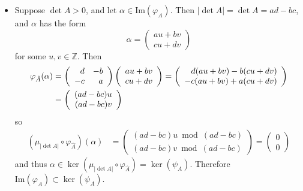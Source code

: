 \documentclass{article}
\begin{document}
\begin{Answer}
\begin{enumerate}[(a)]
{\begin{itemize}
{        so $\mu_n$ is a homomorphism. Let $A \in
        \mathrm{GL}_2(\mathbb{Z})$. Then $\det A \neq 0$ and therefore
        $|\det A|$ is a positive integer, so
        $\psi_A = \mu_{|\det A|} \circ \varphi_{\hat{A}}$ is a
        composition of homomorphisms and thus a homomorphism itself.
      }
      \item{
        Suppose $\det A > 0$, and let $\alpha \in
        \mathrm{Im}(\varphi_A)$.
        Then $|\det A| = \det A = ad - bc$, and
        $\alpha$ has the form
        $$
        \alpha =
        \left(\begin{array}{c}
          a u + b v \\
          c u + d v
        \end{array}\right)
        $$
        for some $u, v \in \mathbb{Z}$. Then
        \begin{align*}
        \varphi_{\hat{A}}(\alpha) &=
        \left(\begin{array}{r r}
           d & -b \\
          -c &  a
        \end{array}\right)
        \left(\begin{array}{c}
          a u + b v \\
          c u + d v
        \end{array}\right) =
        \left(\begin{array}{r}
          d(a u + b v) - b(c u + d v) \\
         -c(a u + b v) + a(c u + d v)
        \end{array}\right) \\ &=
        \left(\begin{array}{r}
          (a d - b c) u \\
          (a d - b c) v
        \end{array}\right)
        \end{align*}
        so
        \begin{align*}
        (\mu_{|\det A|} \circ \varphi_{\hat{A}})(\alpha) &=
        \left(\begin{array}{r}
          (a d - b c) u \bmod (ad - bc) \\
          (a d - b c) v \bmod (ad - bc)
        \end{array}\right) =
        \left(\begin{array}{r}
          0 \\
          0
        \end{array}\right)
        \end{align*}
        and thus $\alpha \in \ker(\mu_{|\det A|} \circ
        \varphi_{\hat{A}}) = \ker(\psi_A)$. Therefore
        $\mathrm{Im}(\varphi_A) \subset \ker(\psi_A)$.

}
\end{itemize}}
\end{enumerate}
\end{Answer}
\end{document}
